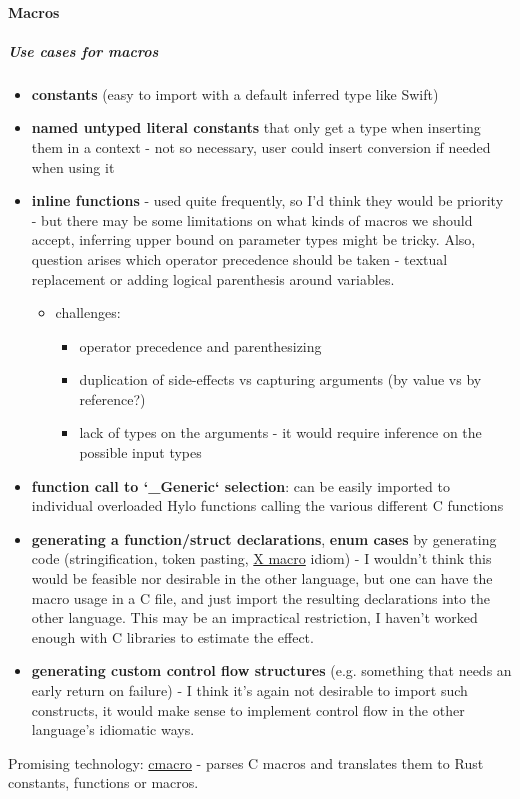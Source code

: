 \paragraph{Macros}

\subparagraph{Use cases for macros}
\begin{itemize}
    \item \textbf{constants} (easy to import with a default inferred type like Swift)
    \item \textbf{named untyped literal constants} that only get a type when inserting them in a context - not so necessary, user could insert conversion if needed when using it
    \item \textbf{inline functions} - used quite frequently, so I'd think they would be priority - but there may be some limitations on what kinds of macros we should accept, inferring upper bound on parameter types might be tricky. Also, question arises which operator precedence should be taken - textual replacement or adding logical parenthesis around variables.
    \begin{itemize}
        \item challenges:
        \begin{itemize}
            \item operator precedence and parenthesizing
            \item duplication of side-effects vs capturing arguments (by value vs by reference?)
            \item lack of types on the arguments - it would require inference on the possible input types
        \end{itemize}
    \end{itemize}
    \item \textbf{function call to `\_Generic` selection}: can be easily imported to individual overloaded Hylo functions calling the various different C functions
    \item \textbf{generating a function/struct declarations}, \textbf{enum cases} by generating code (stringification, token pasting, \href{https://en.wikipedia.org/wiki/X_macro}{X macro} idiom) - I wouldn't think this would be feasible nor desirable in the other language, but one can have the macro usage in a C file, and just import the resulting declarations into the other language. This may be an impractical restriction, I haven't worked enough with C libraries to estimate the effect.
    \item \textbf{generating custom control flow structures} (e.g. something that needs an early return on failure) - I think it's again not desirable to import such constructs, it would make sense to implement control flow in the other language's idiomatic ways.
\end{itemize}
Promising technology: \href{https://github.com/reitermarkus/cmacro-rs/}{cmacro} - parses C macros and translates them to Rust constants, functions or macros.

